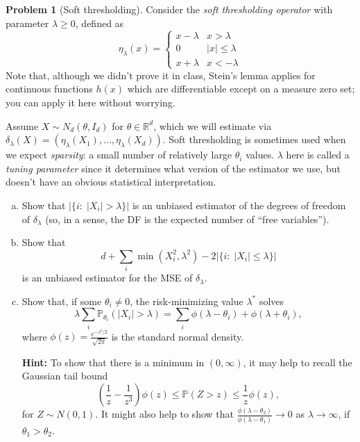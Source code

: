 \documentclass{article}
\newcommand{\PP}{\mathbb{P}}
\newcommand{\RR}{\mathbb{R}}
\theoremstyle{definition}
\newtheorem{problem}{Problem}
\begin{document}
\begin{problem}[Soft thresholding]

Consider the {\em soft thresholding operator} with parameter $\lambda \geq 0$, defined as
\[
\eta_\lambda(x) = 
\begin{cases}
  x - \lambda & x > \lambda\\
  0 & |x| \leq \lambda\\
  x + \lambda & x < -\lambda
\end{cases}
\]
Note that, although we didn't prove it in class, Stein's lemma applies for continuous functions $h(x)$ which are differentiable except on a measure zero set; you can apply it here without worrying.

Assume $X \sim N_d(\theta, I_d)$ for $\theta \in \RR^d$, which we will estimate via $\delta_\lambda(X) = (\eta_\lambda(X_1), \ldots, \eta_\lambda(X_{d}))$. Soft thresholding is sometimes used when we expect {\em sparsity}: a small number of relatively large $\theta_i$ values. $\lambda$ here is called a {\em tuning parameter} since it determines what version of the estimator we use, but doesn't have an obvious statistical interpretation.

\begin{enumerate}[(a)]
\item Show that $\left|\{i:\; |X_i| > \lambda\}\right|$ is an unbiased estimator of the degrees of freedom of $\delta_\lambda$ (so, in a sense, the DF is the expected number of ``free variables'').



\item Show that
\[
d + \sum_i \min(X_i^2, \lambda^2) - 2 \left|\{i:\; |X_i| \leq \lambda\}\right|
\]
is an unbiased estimator for the MSE of $\delta_\lambda$.



\item Show that, if some $\theta_i \neq 0$, the risk-minimizing value $\lambda^*$ solves
\[
\lambda \sum_i \PP_{\theta_i}(|X_i| > \lambda) = \sum_i \phi(\lambda - \theta_i) + \phi(\lambda + \theta_i),
\]
where $\phi(z) = \frac{e^{-z^2/2}}{\sqrt{2\pi}}$ is the standard normal density.

{\bf Hint:} To show that there is a minimum in $(0,\infty)$, it may help to recall the Gaussian tail bound
\[
\left(\frac{1}{z} - \frac{1}{z^3}\right) \phi(z) \leq \PP(Z > z) \leq \frac{1}{z}\phi(z),
\]
for $Z \sim N(0,1)$. It might also help to show that $\frac{\phi(\lambda-\theta_2)}{\phi(\lambda-\theta_1)} \to 0$ as $\lambda\to\infty$, if $\theta_1>\theta_2$.




\end{enumerate}
\end{problem}
\end{document}
